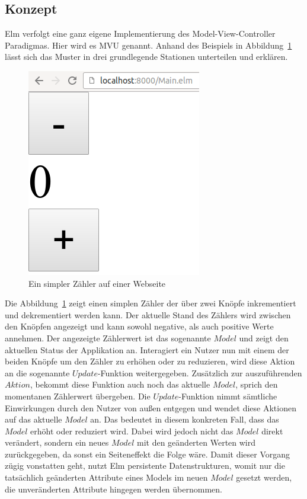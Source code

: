 \subsection{Konzept}
\label{sec:Konzept}
Elm verfolgt eine ganz eigene Implementierung des Model-View-Controller Paradigmas. Hier wird es \ac{MVU} genannt. Anhand des Beispiels in Abbildung~\ref{fig:counter} lässt sich das Muster in drei grundlegende Stationen unterteilen und erklären.
\begin{figure}[h]
	\centering  
	\includegraphics[scale=0.5]{img/counter.png}
	\caption{Ein simpler Zähler auf einer Webseite}\label{fig:counter}
\end{figure}
Die Abbildung~\ref{fig:counter} zeigt einen simplen Zähler der über zwei Knöpfe inkrementiert und dekrementiert werden kann. Der aktuelle Stand des Zählers wird zwischen den Knöpfen angezeigt und kann sowohl negative, als auch positive Werte annehmen.
Der angezeigte Zählerwert ist das sogenannte $Model$ und zeigt den aktuellen Status der Applikation an. Interagiert ein Nutzer nun mit einem der beiden Knöpfe um den Zähler zu erhöhen oder zu reduzieren, wird diese Aktion an die sogenannte $Update$-Funktion weitergegeben. Zusätzlich zur auszuführenden $Aktion$, bekommt diese Funktion auch noch das aktuelle $Model$, sprich den momentanen Zählerwert übergeben.
Die $Update$-Funktion nimmt sämtliche Einwirkungen durch den Nutzer von außen entgegen und wendet diese Aktionen auf das aktuelle $Model$ an. Das bedeutet in diesem konkreten Fall, dass das $Model$ erhöht oder reduziert wird. Dabei wird jedoch nicht das $Model$ direkt verändert, sondern ein neues $Model$ mit den geänderten Werten wird zurückgegeben, da sonst ein Seiteneffekt die Folge wäre. Damit dieser Vorgang zügig vonstatten geht, nutzt Elm persistente Datenstrukturen, womit nur die tatsächlich geänderten Attribute eines Models im neuen $Model$ gesetzt werden, die unveränderten Attribute hingegen werden übernommen.
